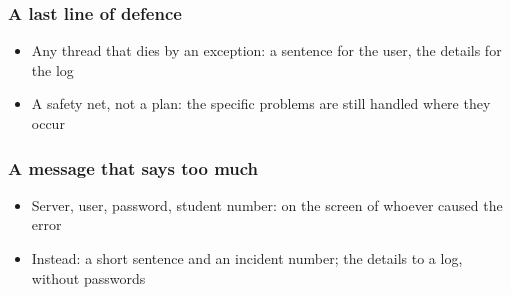\documentclass[aspectratio=169,10pt,compress]{beamer}
\begin{document}
\begin{frame}[t,fragile] \frametitle{A last line of defence}

	\begin{itemize}\footnotesize
		\item<2-> Any thread that dies by an exception: a sentence for the user, the details for the log
		\item<2-> A safety net, not a plan: the specific problems are still handled where they occur
	\end{itemize}
\end{frame}








\begin{frame}[t,fragile] \frametitle{A message that says too much}

	\begin{itemize}\footnotesize
		\item<2-> Server, user, password, student number: on the screen of whoever caused the error
		\item<2-> Instead: a short sentence and an incident number; the details to a log, without passwords
	\end{itemize}
\end{frame}
\end{document}
